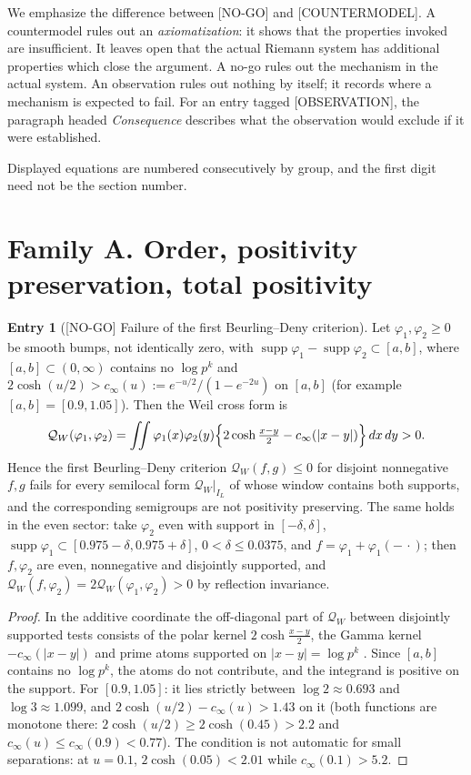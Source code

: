 \documentclass[11pt]{amsart}
\theoremstyle{definition}
\newcounter{family}
\newtheorem{entry}{Entry}[family]
\theoremstyle{remark}
\newcommand{\dd}{\,d}
\newcommand{\QW}{\mathcal Q_W}
\newcommand{\NOGO}{\textup{[NO-GO]}}
\newcommand{\CTMD}{\textup{[COUNTERMODEL]}}
\newcommand{\OBS}{\textup{[OBSERVATION]}}
\begin{document}
We emphasize the difference between \NOGO{} and \CTMD.  A countermodel
rules out an \emph{axiomatization}: it shows that the properties invoked
are insufficient.  It leaves open that the actual Riemann system has
additional properties which close the argument.  A no-go rules out the
mechanism in the actual system.  An observation rules out nothing by
itself; it records where a mechanism is expected to fail.  For an entry
tagged \OBS, the paragraph headed \emph{Consequence} describes what the
observation would exclude if it were established.

Displayed equations are numbered consecutively by group, and the first
digit need not be the section number.

\section{Family A. Order, positivity preservation, total positivity}

\begin{entry}[\NOGO{} Failure of the first Beurling--Deny criterion]
\label{ent:A1}
Let \(\varphi_1,\varphi_2\ge0\) be smooth bumps, not identically zero, with
\(\operatorname{supp}\varphi_1-\operatorname{supp}\varphi_2\subset[a,b]\),
where \([a,b]\subset(0,\infty)\) contains no \(\log p^k\) and
\(2\cosh(u/2)>c_\infty(u):=e^{-u/2}/(1-e^{-2u})\) on \([a,b]\) (for
example \([a,b]=[0.9,1.05]\)).  Then the Weil cross form is
\[
 \QW(\varphi_1,\varphi_2)
 =\iint\varphi_1(x)\varphi_2(y)
 \Bigl\{2\cosh\tfrac{x-y}2-c_\infty(|x-y|)\Bigr\}\dd x\dd y>0 .
\]
Hence the first Beurling--Deny criterion \(\QW(f,g)\le0\) for disjoint
nonnegative \(f,g\) \cite{BeurlingDeny,FukushimaOshimaTakeda} fails for
every semilocal form \(\QW|_{I_L}\) of \cite[Section~16]{TrejoPizzo39}
whose window contains both supports, and the corresponding semigroups are
not positivity preserving.  The same holds in the even sector: take
\(\varphi_2\) even with support in \([-\delta,\delta]\),
\(\operatorname{supp}\varphi_1\subset[0.975-\delta,0.975+\delta]\),
\(0<\delta\le0.0375\), and \(f=\varphi_1+\varphi_1(-\,\cdot)\); then
\(f,\varphi_2\) are even, nonnegative and disjointly supported, and
\(\QW(f,\varphi_2)=2\QW(\varphi_1,\varphi_2)>0\) by reflection invariance.
\end{entry}

\begin{proof}
In the additive coordinate the off-diagonal part of \(\QW\) between
disjointly supported tests consists of the polar kernel
\(2\cosh\frac{x-y}2\), the Gamma kernel \(-c_\infty(|x-y|)\) and prime
atoms supported on \(|x-y|=\log p^k\) \cite[Section~16]{TrejoPizzo39}.
Since \([a,b]\) contains no \(\log p^k\), the atoms do not contribute, and
the integrand is positive on the support.  For \([0.9,1.05]\): it lies
strictly between \(\log2\approx0.693\) and \(\log3\approx1.099\), and
\(2\cosh(u/2)-c_\infty(u)>1.43\) on it (both functions are monotone
there: \(2\cosh(u/2)\ge2\cosh(0.45)>2.2\) and
\(c_\infty(u)\le c_\infty(0.9)<0.77\)).
The condition is not automatic for small separations: at \(u=0.1\),
\(2\cosh(0.05)<2.01\) while \(c_\infty(0.1)>5.2\).
\end{proof}
\end{document}
